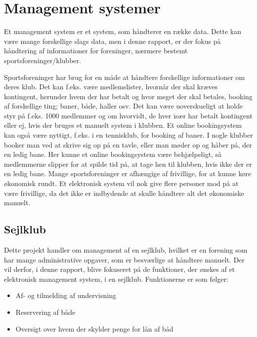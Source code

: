 \chapter{Management systemer}\label{chap:management-systemer}

\cbstart

Et management system er et system, som håndterer en række data. Dette kan være mange forskellige slags data, men i denne
rapport, er der fokus på håndtering af informationer for foreninger, nærmere bestemt sportsforeninger/klubber.

Sportsforeninger har brug for en måde at håndtere forskellige informationer om deres klub. Det kan f.eks. være
medlemslister, hvornår der skal kræves kontingent, herunder hvem der har betalt og hvor meget der skal betales, booking
af forskellige ting; baner, både, haller osv. Det kan være uoverskueligt at holde styr på f.eks. 1000 medlemmer og om
hvorvidt, de hver især har betalt kontingent eller ej, hvis der bruges et manuelt system i klubben. Et online
bookingsystem kan også være nyttigt, f.eks. i en tennisklub, for booking af baner. I nogle klubber booker man ved at
skrive sig op på en tavle, eller man møder op og håber på, der en ledig bane. Her kunne et online bookingsystem være
behjælpeligt, så medlemmerne slipper for at spilde tid på, at tage hen til klubben, hvis ikke der er en ledig bane.
\newline
Mange sportsforeninger er afhængige af frivillige, for at kunne køre økonomisk rundt. Et
elektronisk system vil nok give flere personer mod på at være frivillige, da det ikke er indbydende at skulle håndtere
alt det økonomiske manuelt.

\section{Sejlklub}\label{sec:sejlklub}
Dette projekt handler om management af en sejlklub, hvilket er en forening som har mange administrative opgaver, som er
besværlige at håndtere manuelt. Der vil derfor, i denne rapport, blive fokuseret på de funktioner, der ønskes af et
elektronisk management system, i en sejlklub. Funktionerne er som følger:

\begin{itemize}
\item Af- og tilmelding af undervisning
\item Reservering af både
\item Oversigt over hvem der skylder penge for lån af båd
\end{itemize}




\cbend

